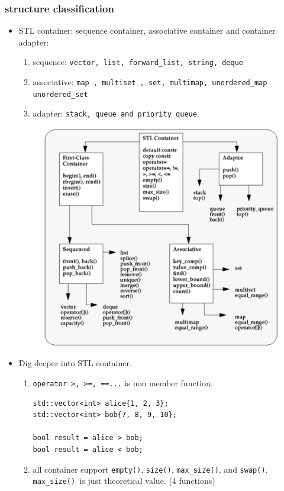 \documentclass[a4paper,11pt,twoside]{book}
\begin{document}
\subsubsection{structure classification}
\begin{itemize}

\item STL container: sequence container, associative container and container adapter:
\begin{enumerate}
\item sequence: \texttt{vector, list, forward\_list, string,  deque}
\item associative: \texttt{map , multiset , set, multimap, unordered\_map unordered\_set}
\item adapter: \texttt{stack, queue and priority\_queue}.
\end{enumerate}

\begin{figure}[ht]
	\centering
	\includegraphics[width=0.7\linewidth]{pics/container.png}
	\caption{}
	\label{fig:constexpr}
\end{figure}

\item Dig deeper into STL container.

\begin{enumerate}
	\item \texttt{operator >, >=, ==...} is non member function. 
\begin{lstlisting}
std::vector<int> alice{1, 2, 3};
std::vector<int> bob{7, 8, 9, 10};

bool result = alice > bob;
bool result = alice < bob;
\end{lstlisting}	


\item all container support \texttt{empty()}, \texttt{size()}, \texttt{max\_size()}, and \texttt{swap()}. \texttt{max\_size() }is just theoretical value. (4  functions)


\end{enumerate}
\end{itemize}
\end{document}

